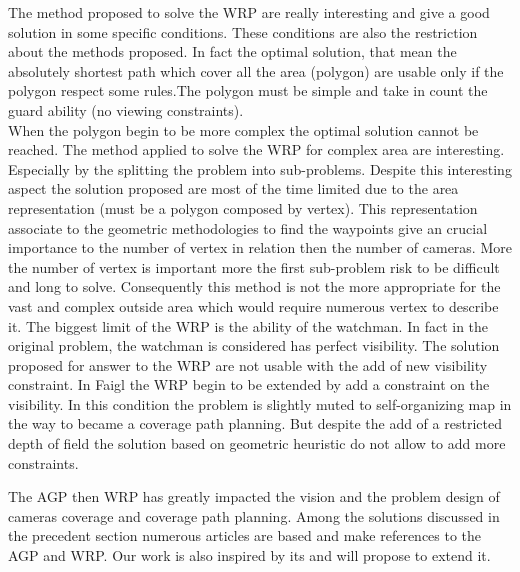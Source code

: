 The method proposed to solve the WRP are really interesting and give a good solution in some specific conditions. These conditions are also the restriction about the methods proposed. In fact the optimal solution, that mean the absolutely shortest path which cover all the area (polygon) are usable only if the polygon respect some rules.The polygon must be simple and take in count the guard ability (no viewing constraints).  \\
When the polygon begin to be more complex the optimal solution cannot be reached. The method applied to solve the WRP for complex area are interesting. Especially by the splitting the problem into sub-problems. Despite this interesting aspect the solution proposed are most of the time limited due to the area representation (must be a polygon composed by vertex). This representation associate to the geometric methodologies to find the waypoints give an crucial importance to the number of vertex in relation then the number of cameras. More the number of vertex is important more the first sub-problem risk to be difficult and long to solve. 
Consequently this method is not the more appropriate for the vast and complex outside area which would require  numerous vertex to describe it.
 The biggest limit of the WRP is the ability of the watchman. In fact in the original problem, the watchman is considered has perfect visibility. The solution proposed for answer to the WRP are not usable with the add of new visibility constraint. 
In Faigl \citep{235*faigl2010} the WRP begin to be extended by add a constraint on the visibility. In this condition the problem is slightly muted to self-organizing map in the way to became a coverage path planning. But despite the add of a restricted  depth of field  the solution based on geometric heuristic do not allow to add more constraints.

The AGP then WRP has greatly impacted the vision and the problem design of cameras coverage and coverage path planning.  Among the solutions discussed in the precedent section numerous articles are based and make references to the AGP and WRP. Our work is also inspired by its and will propose to extend it.



 


%
%
%

